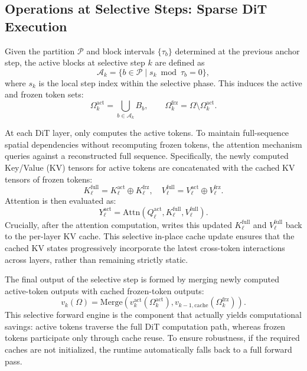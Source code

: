 \subsection{Operations at Selective Steps: Sparse DiT Execution}
\label{sec:selective_step}

Given the partition $\mathcal{P}$ and block intervals $\{\tau_b\}$ determined at the previous anchor step, the active blocks at selective step $k$ are defined as
\begin{equation}
    \mathcal{A}_k = \{ b \in \mathcal{P} \mid s_k \bmod \tau_b = 0 \},
\end{equation}
where $s_k$ is the local step index within the selective phase. This induces the active and frozen token sets:
\begin{equation}
    \Omega_k^{\mathrm{act}} = \bigcup_{b \in \mathcal{A}_k} B_b,
    \qquad
    \Omega_k^{\mathrm{frz}} = \Omega \setminus \Omega_k^{\mathrm{act}}.
\end{equation}

At each DiT layer, \cubic only computes the active tokens. To maintain full-sequence spatial dependencies without recomputing frozen tokens, the attention mechanism queries against a reconstructed full sequence. Specifically, the newly computed Key/Value (KV) tensors for active tokens are concatenated with the cached KV tensors of frozen tokens:
\begin{equation}
    K_\ell^{\mathrm{full}} = K_\ell^{\mathrm{act}} \oplus K_\ell^{\mathrm{frz}}, \quad
    V_\ell^{\mathrm{full}} = V_\ell^{\mathrm{act}} \oplus V_\ell^{\mathrm{frz}}.
\end{equation}
Attention is then evaluated as:
\begin{equation}
    Y_\ell^{\mathrm{act}} =
    \mathrm{Attn}\!\left(
    Q_\ell^{\mathrm{act}},
    K_\ell^{\mathrm{full}},
    V_\ell^{\mathrm{full}}
    \right).
\end{equation}
Crucially, after the attention computation, \cubic writes this updated $K_\ell^{\mathrm{full}}$ and $V_\ell^{\mathrm{full}}$ back to the per-layer KV cache. This selective in-place cache update ensures that the cached KV states progressively incorporate the latest cross-token interactions across layers, rather than remaining strictly static.

The final output of the selective step is formed by merging newly computed active-token outputs with cached frozen-token outputs:
\begin{equation}
    v_k(\Omega) =
    \mathrm{Merge}\!\left(
        v_k^{\mathrm{act}}(\Omega_k^{\mathrm{act}}),
        v_{k-1,\mathrm{cache}}(\Omega_k^{\mathrm{frz}})
    \right).
\end{equation}
This selective forward engine is the component that actually yields computational savings: active tokens traverse the full DiT computation path, whereas frozen tokens participate only through cache reuse. To ensure robustness, if the required caches are not initialized, the runtime automatically falls back to a full forward pass.